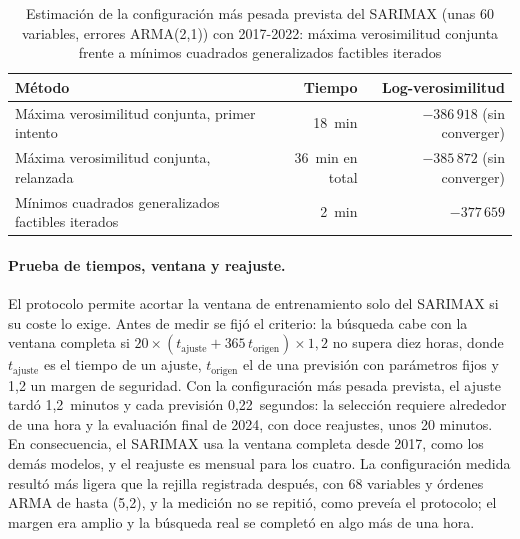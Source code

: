 \begin{table}[htbp]
	\centering
	\caption{Estimación de la configuración más pesada prevista del SARIMAX (unas 60 variables, errores ARMA(2,1)) con 2017-2022: máxima verosimilitud conjunta frente a mínimos cuadrados generalizados factibles iterados}
	\label{tab:fgls}
	\small
	\begin{tabularx}{\textwidth}{>{\raggedright\arraybackslash}X rr}
		\hline
		\textbf{Método} & \textbf{Tiempo} & \textbf{Log-verosimilitud} \\
		\hline
		Máxima verosimilitud conjunta, primer intento & 18~min & $-386\,918$ (sin converger) \\
		Máxima verosimilitud conjunta, relanzada & 36~min en total & $-385\,872$ (sin converger) \\
		Mínimos cuadrados generalizados factibles iterados & 2~min & $-377\,659$ \\
		\hline
	\end{tabularx}
\end{table}

\paragraph{Prueba de tiempos, ventana y reajuste.} El protocolo permite
acortar la ventana de entrenamiento solo del SARIMAX si su coste lo exige.
Antes de medir se fijó el criterio: la búsqueda cabe con la ventana completa
si $20 \times (t_{\mathrm{ajuste}} + 365\, t_{\mathrm{origen}}) \times 1{,}2$ no
supera diez horas, donde $t_{\mathrm{ajuste}}$ es el tiempo de un ajuste,
$t_{\mathrm{origen}}$ el de una previsión con parámetros fijos y 1,2 un margen
de seguridad. Con la configuración más pesada prevista, el ajuste tardó
1,2~minutos y cada previsión 0,22~segundos: la selección requiere alrededor de
una hora y la evaluación final de 2024, con doce reajustes, unos 20 minutos.
En consecuencia, el SARIMAX usa la ventana completa desde 2017, como los
demás modelos, y el reajuste es mensual para los cuatro. La configuración
medida resultó más ligera que la rejilla registrada después, con 68
variables y órdenes ARMA de hasta (5,2), y la medición no se repitió, como
preveía el protocolo; el margen era amplio y la búsqueda real se completó en
algo más de una hora.

